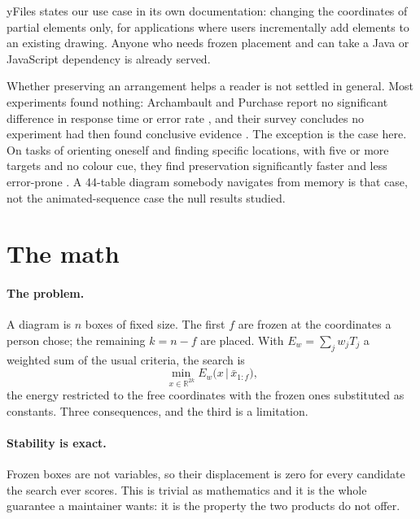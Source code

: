 \documentclass[11pt]{article}
\begin{document}
yFiles states our use case in its own documentation: changing the coordinates of partial
elements only, for applications where users incrementally add elements to an existing
drawing. Anyone who needs frozen placement and can take a Java or JavaScript dependency is
already served.

Whether preserving an arrangement helps a reader is not settled in general. Most experiments
found nothing: Archambault and Purchase report no significant difference in response time or
error rate \cite{ap12}, and their survey concludes no experiment had then found conclusive
evidence \cite{ap13}. The exception is the case here. On tasks of orienting oneself and
finding specific locations, with five or more targets and no colour cue, they find
preservation significantly faster and less error-prone \cite{ap12gd}. A 44-table diagram
somebody navigates from memory is that case, not the animated-sequence case the null results
studied.

\section{The math}

\paragraph{The problem.} A diagram is $n$ boxes of fixed size. The first $f$ are frozen at
the coordinates a person chose; the remaining $k = n - f$ are placed. With
$E_w = \sum_j w_j T_j$ a weighted sum of the usual criteria, the search is
\begin{equation}
\min_{\,x \in \mathbb{R}^{2k}} E_w\big(x \,\big|\, \bar x_{1:f}\big),
\end{equation}
the energy restricted to the free coordinates with the frozen ones substituted as
constants. Three consequences, and the third is a limitation.

\paragraph{Stability is exact.} Frozen boxes are not variables, so their displacement is
zero for every candidate the search ever scores. This is trivial as mathematics and it is
the whole guarantee a maintainer wants: it is the property the two products do not offer.
\end{document}
